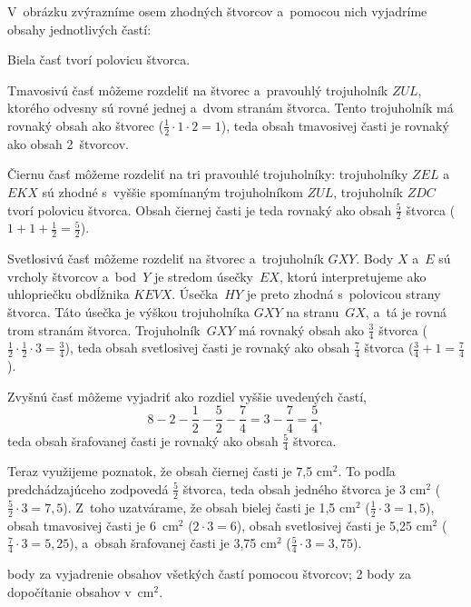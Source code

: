 {%
V~obrázku zvýrazníme osem zhodných štvorcov a~pomocou nich vyjadríme obsahy jednotlivých častí:
%

Biela časť tvorí polovicu štvorca.

Tmavosivú časť môžeme rozdeliť na štvorec a~pravouhlý trojuholník $ZUL$, ktorého odvesny sú rovné jednej a~dvom stranám štvorca.
Tento trojuholník má rovnaký obsah ako štvorec ($\frac12\cdot1\cdot2=1$), teda obsah tmavosivej časti je rovnaký ako obsah 2~štvorcov.

Čiernu časť môžeme rozdeliť na tri pravouhlé trojuholníky:
trojuholníky $ZEL$ a~$EKX$ sú zhodné s~vyššie spomínaným trojuholníkom $ZUL$,
trojuholník $ZDC$ tvorí polovicu štvorca.
Obsah čiernej časti je teda rovnaký ako obsah $\frac52$ štvorca ($1+1+\frac12=\frac52$).

Svetlosivú časť môžeme rozdeliť na štvorec a~trojuholník $GXY$.
Body $X$ a~$E$ sú vrcholy štvorcov a~bod~$Y$ je stredom úsečky~$EX$, ktorú interpretujeme ako uhlopriečku obdĺžnika $KEVX$.
Úsečka~$HY$ je preto zhodná s~polovicou strany štvorca.
Táto úsečka je výškou trojuholníka $GXY$ na stranu~$GX$, a~tá je rovná trom stranám štvorca.
Trojuholník~$GXY$ má rovnaký obsah ako $\frac34$ štvorca ($\frac12\cdot\frac12\cdot3=\frac34$), teda obsah svetlosivej časti je rovnaký ako obsah $\frac74$ štvorca ($\frac34+1=\frac74$).

Zvyšnú časť môžeme vyjadriť ako rozdiel vyššie uvedených častí,
$$
8-2-\frac12-\frac52-\frac74=3-\frac74=\frac54,
$$
teda obsah šrafovanej časti je rovnaký ako obsah $\frac54$ štvorca.

Teraz využijeme poznatok, že obsah čiernej časti je 7,5 cm$^2$.
To podľa predchádzajúceho zodpovedá $\frac52$ štvorca, teda obsah jedného štvorca je 3 cm$^2$ ($\frac52\cdot3=7{,}5$).
Z~toho uzatvárame, že
obsah bielej časti je 1,5 cm$^2$ ($\frac12\cdot3=1{,}5$),
obsah tmavosivej časti je 6~cm$^2$ ($2\cdot3=6$),
obsah svetlosivej časti je 5,25 cm$^2$ ($\frac74\cdot3=5{,}25$),
a~obsah šrafovanej časti je 3,75 cm$^2$ ($\frac54\cdot3=3{,}75$).

 body za vyjadrenie obsahov všetkých častí pomocou štvorcov;
2 body za dopočítanie obsahov v~cm$^2$.
\endhodnotenie}

